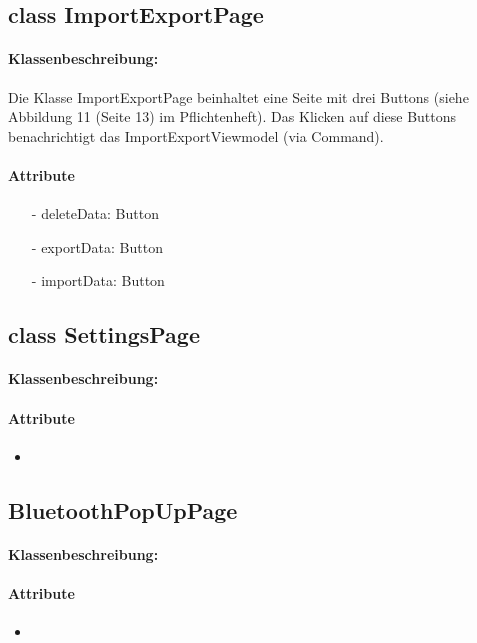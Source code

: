 \documentclass[a4paper,12pt]{article}
\begin{document}
	\subsection{class ImportExportPage}
		\paragraph{Klassenbeschreibung:}
		Die Klasse ImportExportPage beinhaltet eine Seite mit drei Buttons (siehe Abbildung 11 (Seite 13) im Pflichtenheft).
		Das Klicken auf diese Buttons benachrichtigt das ImportExportViewmodel (via Command).
		\paragraph{Attribute}
		\begin{itemize}
			\item [-]deleteData: Button
			\item [-]exportData: Button
			\item [-]importData: Button
		\end{itemize}

	\subsection{class SettingsPage}
	\paragraph{Klassenbeschreibung:}
	\paragraph{Attribute}
		\begin{itemize}
			\item
		\end{itemize}

	\subsection{BluetoothPopUpPage}
	\paragraph{Klassenbeschreibung:}
	\paragraph{Attribute}
		\begin{itemize}
			\item
		\end{itemize}
\end{document}
